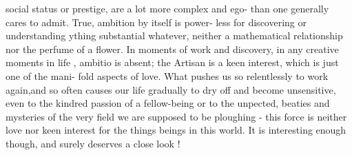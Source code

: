 social status or prestige, are a lot more complex and ego- than
one generally cares to admit.  True,  ambition by itself is  power-%
less for discovering or understanding  ything substantial whatever,
neither a mathematical relationship nor the perfume of a flower.  In 
moments of work and  discovery,  in any creative moments in life , ambitio
is absent; the Artisan is a keen interest,  which is just one of the mani-%
fold aspects of love.  What  pushes us so relentlessly to work again,and
so often causes our life  gradually to dry off and become unsensitive,
even to the kindred passion of a fellow-being\hand{,} or to the unpected,
beaties and mysteries of the very field we are supposed to be ploughing
-  this force is neither love nor keen interest for the things  beings
in this world.  It is interesting enough though,  and surely deserves
a close look !

